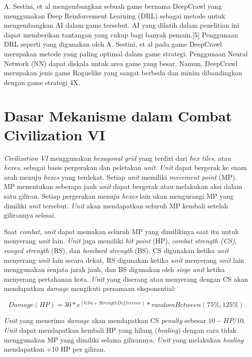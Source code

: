 A. Sestini, et al \citep{deepCrawl} mengembangkan sebuah game bernama DeepCrawl yang menggunakan Deep Reinforcement Learning (DRL) sebagai metode untuk mengembangkan AI dalam game tersebut. AI yang dilatih dalam penelitian ini dapat memberikan tantangan yang cukup bagi banyak pemain.[5] Penggunaan DRL seperti yang digunakan oleh A. Sestini, et al pada game DeepCrawl merupakan metode yang paling optimal dalam game strategi. Penggunaan Neural Network (NN) dapat diskala untuk area game yang besar. Namun, DeepCrawl merupakan jenis game Roguelike yang sangat berbeda dan minim dibandingkan dengan game strategi 4X.

\section{Dasar Mekanisme dalam Combat Civilization VI}
\emph{Civilization VI} menggunakan \emph{hexagonal grid} yang terdiri dari \emph{hex tiles}, atau \emph{hexes}, sebagai basis pergerakan dan peletakan \emph{unit}. 
\emph{Unit} dapat bergerak ke enam arah menuju \emph{hexes} yang terdekat. Setiap \emph{unit} memiliki \emph{movement point} (MP). 
MP menentukan seberapa jauh \emph{unit} dapat bergerak atau melakukan aksi dalam satu giliran. 
Setiap pergerakan menuju \emph{hexes} lain akan mengurangi MP yang dimiliki \emph{unit} tersebut.
\emph{Unit} akan mendapatkan seluruh MP kembali setelah gilirannya selesai.

Saat \emph{combat}, \emph{unit} dapat memakan seluruh MP yang dimilikinya saat itu untuk menyerang \emph{unit} lain.
\emph{Unit} juga memiliki \emph{hit point} (HP), \emph{combat strength (CS)}, \emph{ranged strength} (RS), dan \emph{bombard strength} (BS).
CS digunakan ketika \emph{unit} menyerang \emph{unit} lain secara dekat, RS digunakan ketika \emph{unit} menyerang \emph{unit} lain menggunakan senjata jarak jauh, dan BS digunakan oleh \emph{siege} \emph{unit} ketika menyerang pertahanan kota.
\emph{Unit} yang diserang atau menyerang dengan CS akan mendapatkan \emph{damage} mengikuti persamaan eksponential\citep{civ6Combat}:

\[Damage(HP) = 30 * e^{(0.04+StrengthDifference)} * randomBetween(75\%, 125\%)\]

\emph{Unit} yang menerima \emph{damage} akan mendapatkan CS \emph{penalty} sebesar \(10 - HP/10\).
\emph{Unit} dapat mendapatkan kembali HP yang hilang (\emph{healing}) dengan cara tidak menggunakan MP yang dimiliki selama gilirannya.
\emph{Unit} yang melakukan \emph{healing} mendapatkan +10 HP per giliran.

